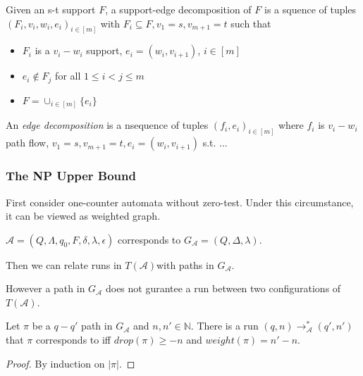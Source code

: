 \documentclass{beamer}
\begin{document}
\begin{frame}
\begin{definition}
Given an s-t support $F$, a support-edge decomposition of $F$ is a squence of tuples $(F_i, v_i, w_i, e_i)_{i\in [m]}$ with $F_i\subseteq F, v_1 = s, v_{m+1} = t$ such that 
\begin{itemize}
\item $F_i$ is a $v_i-w_i$ support, $e_i=(w_i, v_{i+1})$, $i\in [m]$
\item $e_i\notin F_j$ for all $1 \le i < j \le m$

\item $F = \cup_{i\in [m]} \{e_i\}$
\end{itemize}
\end{definition}

An \textit{edge decomposition} is a nsequence of tuples $(f_i, e_i)_{
i\in [m]}$ where $f_i$ is $v_i-w_i$ path flow, $v_1 = s, v_{m+1} = t, e_i = (w_i, v_{i+1})$ s.t. ...

\end{frame}

\begin{frame}
\frametitle{The NP Upper Bound}

First consider one-counter automata without zero-test. Under this circumstance, it can be viewed as weighted graph.

$\mathcal{A} = (Q,\Lambda, q_0, F, \delta, \lambda, \epsilon)$ corresponds to $G_{\mathcal{A}}=(Q,\Delta, \lambda)$.

Then we can relate runs in $T(\mathcal{A}) $with paths in $G_{\mathcal{A}}$.


However a path in $G_{\mathcal{A}}$ does not gurantee a run between two configurations of $T(\mathcal{A})$.

\end{frame}

\begin{frame}

\begin{lemma}[4.1.11]
Let $\pi$ be a $q-q'$ path in $G_\mathcal{A}$ and $n,n'\in \mathbb{N}$.
There is a run $(q, n) \rightarrow^*_{\mathcal{A}} (q', n')$ that $\pi$ corresponds to iff $drop(\pi) \ge -n$ and $weight(\pi) = n'-n$.

\end{lemma}

\begin{proof}
By induction on $|\pi|$.

\end{proof}
\end{frame}
\end{document}
